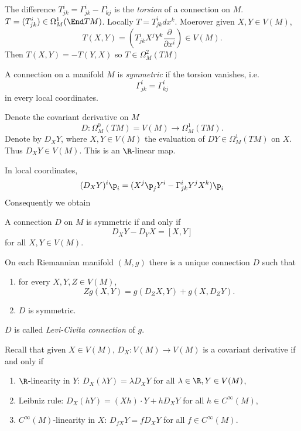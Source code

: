 \documentclass[a4paper]{article}
\begin{document}
The difference \(T^i_{jk} = \Gamma^i_{jk} - \Gamma^i_{kj}\) is the \emph{torsion} of a connection on \(M\). \(T = (T^i_{jk}) \in \Omega^1_M(\End TM)\). Locally \(T = T^i_{jk} dx^k\). Moerover given \(X, Y \in V(M)\),
\[
  T(X, Y) = (T^i_{jk} X^j Y^k \frac{\partial  }{\partial x^i}) \in V(M).
\]
Then \(T(X, Y) = -T(Y, X)\) so \(T \in \Omega^2_M(TM)\)

\begin{definition}
  A connection on a manifold \(M\) is \emph{symmetric} if the torsion vanishes, i.e.
  \[
    \Gamma^i_{jk} = \Gamma^i_{kj}
  \]
  in every local coordinates.
\end{definition}

Denote the covariant derivative on \(M\)
\[
  D: \Omega_M^0(TM) = V(M) \to \Omega_M^1(TM).
\]
Denote by \(D_XY\), where \(X, Y \in V(M)\) the evaluation of \(DY \in \Omega^1_M(TM)\) on \(X\). Thus \(D_XY \in V(M)\). This is an \(\R\)-linear map.

In local coordinates,
\[
  (D_XY)^i \p_i = (X^j\p_j Y^i - \Gamma^i_{jk} Y^jX^k) \p_i
\]
Consequently we obtain

\begin{proposition}
  A connection \(D\) on \(M\) is symmetric if and only if
  \[
    D_XY - D_YX = [X, Y]
  \]
  for all \(X, Y \in V(M)\).
\end{proposition}

\begin{theorem}
  \label{thm:Levi-Civita}
  On each Riemannian manifold \((M, g)\) there is a unique connection \(D\) such that
  \begin{enumerate}
  \item for every \(X, Y, Z \in V(M)\),
    \[
      Zg(X, Y) = g(D_ZX, Y) + g(X, D_ZY).
    \]
  \item \(D\) is symmetric.
  \end{enumerate}

  \(D\) is called \emph{Levi-Civita connection} of \(g\).
\end{theorem}

Recall that given \(X \in V(M)\), \(D_X: V(M) \to V(M)\) is a covariant derivative if and only if
\begin{enumerate}
\item \(\R\)-linearity in \(Y\): \(D_X(\lambda Y) = \lambda D_XY\) for all \(\lambda \in \R, Y \in V(M)\),
\item Leibniz rule: \(D_X(hY) = (Xh) \cdot Y + hD_XY\) for all \(h \in C^\infty(M)\),
\item \(C^\infty(M)\)-linearity in \(X\): \(D_{fX}Y = fD_XY\) for all \(f \in C^\infty(M)\).
\end{enumerate}
\end{document}
